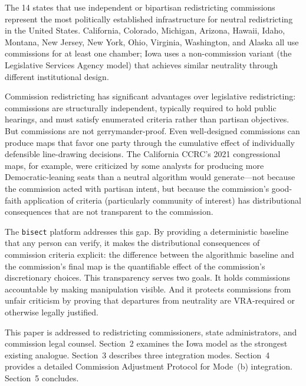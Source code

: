 The 14 states that use independent or bipartisan redistricting commissions represent the most politically established infrastructure for neutral redistricting in the United States. California, Colorado, Michigan, Arizona, Hawaii, Idaho, Montana, New Jersey, New York, Ohio, Virginia, Washington, and Alaska all use commissions for at least one chamber; Iowa uses a non-commission variant (the Legislative Services Agency model) that achieves similar neutrality through different institutional design.

Commission redistricting has significant advantages over legislative redistricting: commissions are structurally independent, typically required to hold public hearings, and must satisfy enumerated criteria rather than partisan objectives. But commissions are not gerrymander-proof. Even well-designed commissions can produce maps that favor one party through the cumulative effect of individually defensible line-drawing decisions. The California CCRC's 2021 congressional maps, for example, were criticized by some analysts for producing more Democratic-leaning seats than a neutral algorithm would generate---not because the commission acted with partisan intent, but because the commission's good-faith application of criteria (particularly community of interest) has distributional consequences that are not transparent to the commission.

The \texttt{bisect} platform addresses this gap. By providing a deterministic baseline that any person can verify, it makes the distributional consequences of commission criteria explicit: the difference between the algorithmic baseline and the commission's final map is the quantifiable effect of the commission's discretionary choices. This transparency serves two goals. It holds commissions accountable by making manipulation visible. And it protects commissions from unfair criticism by proving that departures from neutrality are VRA-required or otherwise legally justified.

This paper is addressed to redistricting commissioners, state administrators, and commission legal counsel. Section~2 examines the Iowa model as the strongest existing analogue. Section~3 describes three integration modes. Section~4 provides a detailed Commission Adjustment Protocol for Mode~(b) integration. Section~5 concludes.
